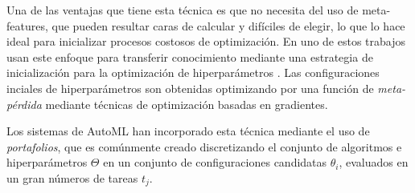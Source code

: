 Una de las ventajas que tiene esta técnica es que no necesita del uso de meta-features, que pueden resultar caras de calcular y difíciles de elegir, lo que lo hace ideal para inicializar procesos costosos de optimización. En uno de estos trabajos usan este enfoque para transferir conocimiento mediante una estrategia de inicialización para la optimización de hiperparámetros \cite{witsuba2015learning}. Las configuraciones inciales de hiperparámetros son obtenidas optimizando por una función de \textit{meta-pérdida} mediante técnicas de optimización basadas en gradientes.

%

Los sistemas de AutoML han incorporado esta técnica mediante el uso de \textit{portafolios}, que es comúnmente creado discretizando el conjunto de algoritmos e hiperparámetros $\Theta$ en un conjunto de configuraciones candidatas $\theta_i$, evaluados en un gran números de tareas $t_j$.

